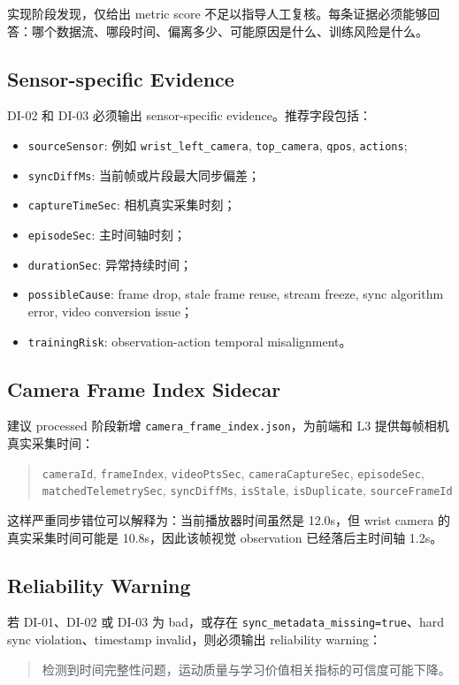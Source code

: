 \documentclass[UTF8,zihao=-4]{ctexart}
\newcommand{\Code}[1]{\texttt{#1}}
\begin{document}
实现阶段发现，仅给出 metric score 不足以指导人工复核。每条证据必须能够回答：哪个数据流、哪段时间、偏离多少、可能原因是什么、训练风险是什么。

\subsection*{Sensor-specific Evidence}

DI-02 和 DI-03 必须输出 sensor-specific evidence。推荐字段包括：

\begin{itemize}
\item \Code{sourceSensor}: 例如 \Code{wrist\_left\_camera}, \Code{top\_camera}, \Code{qpos}, \Code{actions};
\item \Code{syncDiffMs}: 当前帧或片段最大同步偏差；
\item \Code{captureTimeSec}: 相机真实采集时刻；
\item \Code{episodeSec}: 主时间轴时刻；
\item \Code{durationSec}: 异常持续时间；
\item \Code{possibleCause}: frame drop, stale frame reuse, stream freeze, sync algorithm error, video conversion issue；
\item \Code{trainingRisk}: observation-action temporal misalignment。
\end{itemize}

\subsection*{Camera Frame Index Sidecar}

建议 processed 阶段新增 \Code{camera\_frame\_index.json}，为前端和 L3 提供每帧相机真实采集时间：

\begin{quote}\small
\Code{cameraId}, \Code{frameIndex}, \Code{videoPtsSec}, \Code{cameraCaptureSec}, \Code{episodeSec}, \Code{matchedTelemetrySec}, \Code{syncDiffMs}, \Code{isStale}, \Code{isDuplicate}, \Code{sourceFrameId}
\end{quote}

这样严重同步错位可以解释为：当前播放器时间虽然是 12.0s，但 wrist camera 的真实采集时间可能是 10.8s，因此该帧视觉 observation 已经落后主时间轴 1.2s。

\subsection*{Reliability Warning}

若 DI-01、DI-02 或 DI-03 为 bad，或存在 \Code{sync\_metadata\_missing=true}、hard sync violation、timestamp invalid，则必须输出 reliability warning：

\begin{quote}
检测到时间完整性问题，运动质量与学习价值相关指标的可信度可能下降。
\end{quote}
\end{document}
